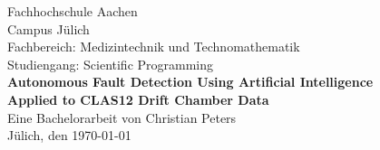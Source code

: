 \begin{titlepage}
  \begin{center}
    \LARGE{Fachhochschule Aachen\\}
    \Large{Campus J\"ulich\\}
    \vspace{2cm}
    \Large{Fachbereich: Medizintechnik und Technomathematik\\}
    \Large{Studiengang: Scientific Programming\\}
    \vspace{3cm}
    \LARGE{\textbf{Autonomous Fault Detection Using Artificial
        Intelligence\\}}
    \LARGE{\textbf{Applied to CLAS12 Drift Chamber Data\\}}
    \vspace{3cm}
    \Large{Eine Bachelorarbeit von Christian Peters\\}
    \vspace{2cm}
    \Large{J\"ulich, den \today}
  \end{center}
\end{titlepage}
